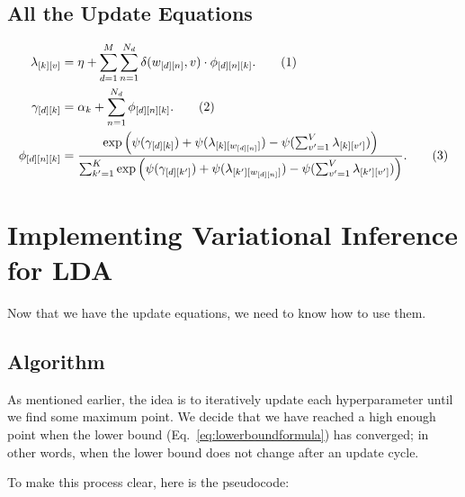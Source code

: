 \documentclass[12pt]{article}
\newcommand\numberthis{\addtocounter{equation}{1}\tag{\theequation}}
\begin{document}
\subsection{All the Update Equations}

\begin{align*}
    \lambda_{[k][v]} &= \eta + \sum_{d=1}^{M} \sum_{n=1}^{N_{d}}
    \delta(w_{[d][n]}, v)\cdot\phi_{[d][n][k]}.
    \numberthis\label{eq:lambdaupdate}
    \\*
    \gamma_{[d][k]} &= \alpha_{k} + \sum_{n=1}^{N_{d}} \phi_{[d][n][k]}.
    \numberthis\label{eq:gammaupdate}
    \\*
    \phi_{[d][n][k]} &= \frac{\exp \left( \psi(\gamma_{[d][k]})
    +
    \psi(\lambda_{[k][w_{[d][n]}]}) - \psi(\sum_{v'=1}^{V} \lambda_{[k][v']})
    \right)}
    {\sum_{k'=1}^{K} \exp \left( \psi(\gamma_{[d][k']})
    +
    \psi(\lambda_{[k'][w_{[d][n]}]}) - \psi(\sum_{v'=1}^{V}
    \lambda_{[k'][v']})
    \right)}.\numberthis\label{eq:phiupdate}
\end{align*}

\section{Implementing Variational Inference for LDA}

Now that we have the update equations, we need to know how to use them.

\subsection{Algorithm}

As mentioned earlier, the idea is to iteratively update each hyperparameter
until we find some maximum point.  We decide that we have reached a high enough
point when the lower bound (Eq.~\ref{eq:lowerboundformula}) has converged; in
other words, when the lower bound does not change after an update cycle.

To make this process clear, here is the pseudocode:
\end{document}
